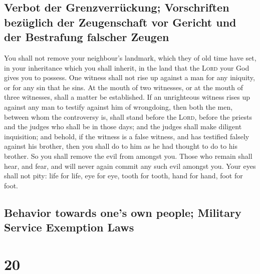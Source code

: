 \hypertarget{verbot-der-grenzverruxfcckung-vorschriften-bezuxfcglich-der-zeugenschaft-vor-gericht-und-der-bestrafung-falscher-zeugen}{%
\subsection{Verbot der Grenzverrückung; Vorschriften bezüglich der
Zeugenschaft vor Gericht und der Bestrafung falscher
Zeugen}\label{verbot-der-grenzverruxfcckung-vorschriften-bezuxfcglich-der-zeugenschaft-vor-gericht-und-der-bestrafung-falscher-zeugen}}

 You shall not remove your neighbour's landmark, which
they of old time have set, in your inheritance which you shall inherit,
in the land that the \textsc{Lord} your God gives you to possess.
 One witness shall not rise up against a man for any
iniquity, or for any sin that he sins. At the mouth of two witnesses, or
at the mouth of three witnesses, shall a matter be established.
 If an unrighteous witness rises up against any man to
testify against him of wrongdoing,  then both the men,
between whom the controversy is, shall stand before the \textsc{Lord},
before the priests and the judges who shall be in those days;
 and the judges shall make diligent inquisition; and
behold, if the witness is a false witness, and has testified falsely
against his brother,  then you shall do to him as he had
thought to do to his brother. So you shall remove the evil from amongst
you.  Those who remain shall hear, and fear, and will
never again commit any such evil amongst you.  Your eyes
shall not pity: life for life, eye for eye, tooth for tooth, hand for
hand, foot for foot.

\hypertarget{behavior-towards-ones-own-people-military-service-exemption-laws}{%
\subsection{Behavior towards one's own people; Military Service
Exemption
Laws}\label{behavior-towards-ones-own-people-military-service-exemption-laws}}

\hypertarget{section-19}{%
\section{20}\label{section-19}}

